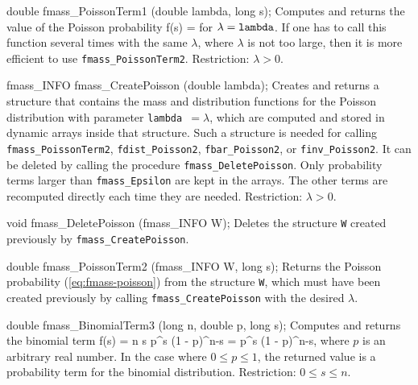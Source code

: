 \code

double fmass_PoissonTerm1 (double lambda, long s);
\endcode
 \tab  Computes and returns the value of the Poisson probability 
 \eq
  f(s) =     
 \endeq
  for $\lambda = {\tt lambda}$. 
  If one has to call this function several times with the same $\lambda$,
  where $\lambda$ is not too large, then it is more efficient to use
  {\tt fmass\_PoissonTerm2}.
  Restriction: $\lambda > 0$. 
 \endtab
\code


fmass_INFO fmass_CreatePoisson (double lambda);
\endcode
  \tab Creates and returns a structure that contains
   the mass and distribution functions for the Poisson
   distribution with parameter {\tt lambda $= \lambda$}, which are
   computed and stored in dynamic arrays inside that structure.
   Such a structure is needed for calling {\tt fmass\_PoissonTerm2},
   {\tt fdist\_Poisson2}, {\tt fbar\_Poisson2}, or {\tt finv\_Poisson2}.
   It can be deleted by calling the procedure {\tt fmass\_DeletePoisson}.
  \ifdetailed  %
   Only probability terms larger than {\tt fmass\_Epsilon} 
   are kept in the arrays. The other terms are recomputed directly each time
   they are needed. 
  \fi  %
   Restriction:  $\lambda > 0$. 
 \endtab
\code


void fmass_DeletePoisson (fmass_INFO W);
\endcode
 \tab Deletes the structure {\tt W} created previously 
   by {\tt fmass\_CreatePoisson}.
 \endtab
\code

  
double fmass_PoissonTerm2 (fmass_INFO W, long s);
\endcode
 \tab  Returns the Poisson probability (\ref{eq:fmass-poisson})
  from the structure {\tt W}, which must have been created previously
  by calling {\tt fmass\_CreatePoisson} with the desired $\lambda$.
 \endtab

\code


double fmass_BinomialTerm3 (long n, double p, long s);
\endcode
 \tab   Computes and returns the binomial term
  \eq
     f(s) = {n \choose s} p^s (1 - p)^{n-s} =
       \; p^s (1 - p)^{n-s},       
  \endeq
  where $p$ is an arbitrary real number.
  In the case where $0 \le p \le 1$, the returned
  value is a probability term for the binomial distribution.
  Restriction: $0\le s\le n$.
  \endtab
\code



